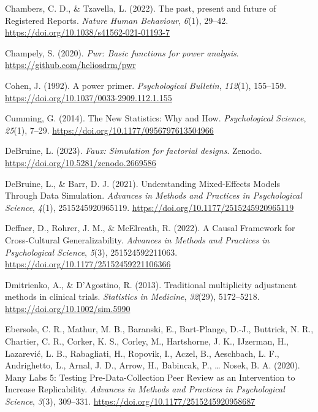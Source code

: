 \documentclass[
  man,
  floatsintext,
  longtable,
  a4paper,
  nolmodern,
  notxfonts,
  notimes,
  colorlinks=true,linkcolor=blue,citecolor=blue,urlcolor=blue]{apa7}
\newlength{\cslhangindent}
\newenvironment{CSLReferences}[2] %
 {\begin{list}{}{%
  \setlength{\itemindent}{0pt}
  \setlength{\leftmargin}{0pt}
  \setlength{\parsep}{0pt}
  \ifodd #1
   \setlength{\leftmargin}{\cslhangindent}
   \setlength{\itemindent}{-1\cslhangindent}
  \fi
  \setlength{\itemsep}{#2\baselineskip}}}
 {\end{list}}
\begin{document}
\begin{CSLReferences}{1}{0}
Chambers, C. D., \& Tzavella, L. (2022). The past, present and future of
{Registered Reports}. \emph{Nature Human Behaviour}, \emph{6}(1),
29--42. \url{https://doi.org/10.1038/s41562-021-01193-7}

Champely, S. (2020). \emph{Pwr: Basic functions for power analysis}.
\url{https://github.com/heliosdrm/pwr}

Cohen, J. (1992). A power primer. \emph{Psychological Bulletin},
\emph{112}(1), 155--159.
\url{https://doi.org/10.1037/0033-2909.112.1.155}

Cumming, G. (2014). The {New Statistics}: {Why} and {How}.
\emph{Psychological Science}, \emph{25}(1), 7--29.
\url{https://doi.org/10.1177/0956797613504966}

DeBruine, L. (2023). \emph{Faux: Simulation for factorial designs}.
Zenodo. \url{https://doi.org/10.5281/zenodo.2669586}

DeBruine, L., \& Barr, D. J. (2021). Understanding {Mixed-Effects Models
Through Data Simulation}. \emph{Advances in Methods and Practices in
Psychological Science}, \emph{4}(1), 2515245920965119.
\url{https://doi.org/10.1177/2515245920965119}

Deffner, D., Rohrer, J. M., \& McElreath, R. (2022). A {Causal
Framework} for {Cross-Cultural Generalizability}. \emph{Advances in
Methods and Practices in Psychological Science}, \emph{5}(3),
251524592211063. \url{https://doi.org/10.1177/25152459221106366}

Dmitrienko, A., \& D'Agostino, R. (2013). Traditional multiplicity
adjustment methods in clinical trials. \emph{Statistics in Medicine},
\emph{32}(29), 5172--5218. \url{https://doi.org/10.1002/sim.5990}

Ebersole, C. R., Mathur, M. B., Baranski, E., Bart-Plange, D.-J.,
Buttrick, N. R., Chartier, C. R., Corker, K. S., Corley, M., Hartshorne,
J. K., IJzerman, H., Lazarević, L. B., Rabagliati, H., Ropovik, I.,
Aczel, B., Aeschbach, L. F., Andrighetto, L., Arnal, J. D., Arrow, H.,
Babincak, P., \ldots{} Nosek, B. A. (2020). Many {Labs} 5: {Testing
Pre-Data-Collection Peer Review} as an {Intervention} to {Increase
Replicability}. \emph{Advances in Methods and Practices in Psychological
Science}, \emph{3}(3), 309--331.
\url{https://doi.org/10.1177/2515245920958687}


\end{CSLReferences}
\end{document}
